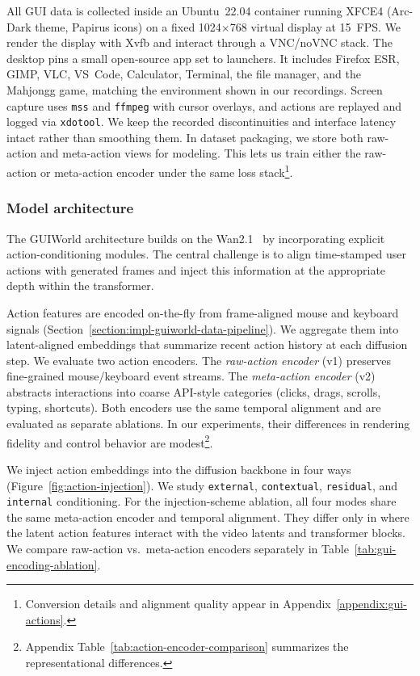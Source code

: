 All GUI data is collected inside an Ubuntu~22.04 container running XFCE4 (Arc-Dark theme, Papirus icons) on a fixed 1024$\times$768 virtual display at 15~FPS.
We render the display with Xvfb and interact through a VNC/noVNC stack.
The desktop pins a small open-source app set to launchers.
It includes Firefox ESR, GIMP, VLC, VS~Code, Calculator, Terminal, the file manager, and the Mahjongg game, matching the environment shown in our recordings.
Screen capture uses \texttt{mss} and \texttt{ffmpeg} with cursor overlays, and actions are replayed and logged via \texttt{xdotool}.
We keep the recorded discontinuities and interface latency intact rather than smoothing them.
In dataset packaging, we store both raw-action and meta-action views for modeling.
This lets us train either the raw-action or meta-action encoder under the same loss stack\footnote{Conversion details and alignment quality appear in Appendix~\ref{appendix:gui-actions}.}.

\subsubsection{Model architecture}

The GUIWorld architecture builds on the Wan2.1~\citep{wan2025wan} by incorporating explicit action-conditioning modules.
The central challenge is to align time-stamped user actions with generated frames and inject this information at the appropriate depth within the transformer.

Action features are encoded on-the-fly from frame-aligned mouse and keyboard signals (Section~\ref{section:impl-guiworld-data-pipeline}).
We aggregate them into latent-aligned embeddings that summarize recent action history at each diffusion step.
We evaluate two action encoders.
The \emph{raw-action encoder} (v1) preserves fine-grained mouse/keyboard event streams.
The \emph{meta-action encoder} (v2) abstracts interactions into coarse API-style categories (clicks, drags, scrolls, typing, shortcuts).
Both encoders use the same temporal alignment and are evaluated as separate ablations.
In our experiments, their differences in rendering fidelity and control behavior are modest\footnote{Appendix Table~\ref{tab:action-encoder-comparison} summarizes the representational differences.}.

We inject action embeddings into the diffusion backbone in four ways (Figure~\ref{fig:action-injection}).
We study \texttt{external}, \texttt{contextual}, \texttt{residual}, and \texttt{internal} conditioning.
For the injection-scheme ablation, all four modes share the same meta-action encoder and temporal alignment.
They differ only in where the latent action features interact with the video latents and transformer blocks.
We compare raw-action vs.\ meta-action encoders separately in Table~\ref{tab:gui-encoding-ablation}.

